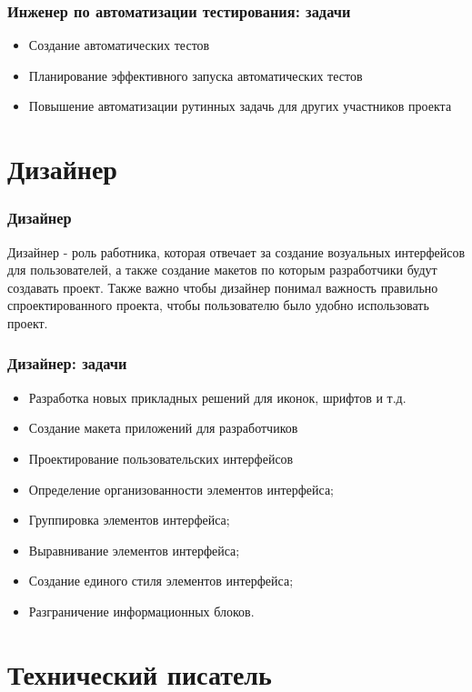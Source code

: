 \documentclass{../industrial-development}
\begin{document}
	\begin{frame} \frametitle{Инженер по автоматизации тестирования: задачи}
		\begin{itemize}
			\item Создание автоматических тестов
			\item Планирование эффективного запуска автоматических тестов
			\item Повышение автоматизации рутинных задачь для других участников проекта		
		\end{itemize}
	\end{frame}
	
	\section{Дизайнер }
	
	\begin{frame} \frametitle{Дизайнер}
		\begin{block}{}
			\alert {Дизайнер} - роль работника, которая отвечает за создание возуальных интерфейсов для пользователей, а также создание макетов по которым разработчики будут создавать проект. Также важно чтобы дизайнер понимал важность правильно спроектированного проекта, чтобы пользователю было удобно использовать проект.
		\end{block}
		
	\end{frame}
	
	\begin{frame} \frametitle{Дизайнер: задачи}
		\begin{itemize}
			\item Разработка новых прикладных решений для иконок, шрифтов и т.д.
			\item Создание макета приложений для разработчиков
			\item Проектирование пользовательских интерфейсов
			\item Определение организованности элементов интерфейса;
			\item Группировка элементов интерфейса;
			\item Выравнивание элементов интерфейса;
			\item Создание единого стиля элементов интерфейса;
			\item Разграничение информационных блоков.
		\end{itemize}
	\end{frame}
	
	
	\section{Технический писатель }
	
\end{document}
